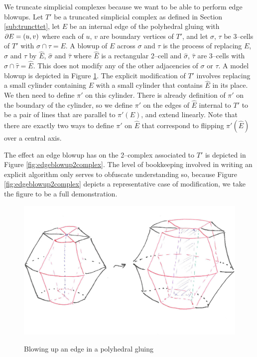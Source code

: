 We truncate simplicial complexes because we want to be able to perform edge blowups.
Let $T'$ be a truncated simplicial complex as defined in Section \ref{sub:truncttet}, let $E$ be an internal edge of the polyhedral gluing with $\partial E=(u,v)$ where each of $u$, $v$ are boundary vertices of $T'$, and let $\sigma$, $\tau$ be 3--cells of $T'$ with $\sigma\cap\tau=E$.
A blowup of $E$ across $\sigma$ and $\tau$ is the process of replacing $E$, $\sigma$ and $\tau$ by $\hat{E}$, $\hat{\sigma}$ and $\hat{\tau}$ where $\hat{E}$ is a rectangular 2--cell and $\hat{\sigma}$, $\hat{\tau}$ are 3--cells with $\hat{\sigma}\cap\hat{\tau}=\hat{E}$.
This does not modify any of the other adjacencies of $\sigma$ or $\tau$.
A model blowup is depicted in Figure \ref{fig:edgeblowup}.
The explicit modification of $T'$ involves replacing a small cylinder containing $E$ with a small cylinder that contains $\hat{E}$ in its place.
We then need to define $\pi'$ on this cylinder.
There is already definition of $\pi'$ on the boundary of the cylinder, so we define $\pi'$ on the edges of $\hat{E}$ internal to $T'$ to be a pair of lines that are parallel to $\pi'(E)$, and extend linearly.
Note that there are exactly two ways to define $\pi'$ on $\hat{E}$ that correspond to flipping $\pi'(\hat{E})$ over a central axis.

The effect an edge blowup has on the 2--complex associated to $T'$ is depicted in Figure \ref{fig:edgeblowup2complex}.
The level of bookkeeping involved in writing an explicit algorithm only serves to obfuscate understanding so, because Figure \ref{fig:edgeblowup2complex} depicts a representative case of modification, we take the figure to be a full demonstration.

\begin{figure}
	\centering
	\captionsetup{justification=centering}
	\caption{Blowing up an edge in a polyhedral gluing}
	\includegraphics[width=5.5in]{figures/edgeblowup.jpg}
	\label{fig:edgeblowup}
\end{figure}

